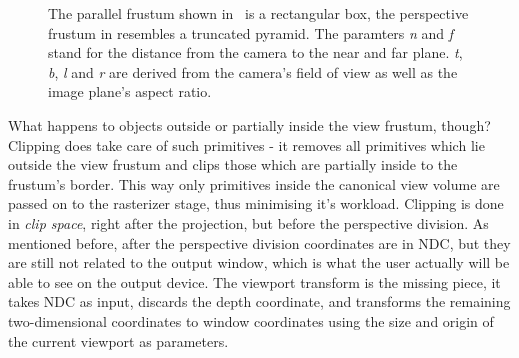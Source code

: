 \begin{figure}
\centering
{}
\caption[Parallel and Perspective Frustum]{The parallel frustum shown
in~ is a rectangular box, the perspective 
frustum in  resembles a truncated
pyramid. The paramters \textit{n} and \textit{f} stand for the distance from the
camera to the near and far plane. \textit{t}, \textit{b}, \textit{l} and
\textit{r} are derived from the camera's field of view as well as the image
plane's aspect ratio.}
\label{fig:parallelandperspectivefrustum}
\end{figure}

What happens to objects outside or partially inside the view frustum, though?
Clipping does take care of such primitives - it removes all primitives which
lie outside the view frustum and clips those which are partially inside to the
frustum's border. This way only primitives inside the canonical view volume are
passed on to the rasterizer stage, thus minimising it's workload. Clipping is
done in \textit{clip space}, right after the projection, but before the
perspective division. As mentioned before, after the perspective division
coordinates are in NDC, but they are still not related to the output window,
which is what the user actually will be able to see on the output device. The
viewport transform is the missing piece, it takes NDC as input, discards the
depth coordinate, and transforms the remaining two-dimensional coordinates to
window coordinates using the size and origin of the current viewport as
parameters.

